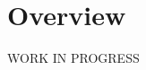 \documentclass[../../DD.tex]{subfiles}
\begin{document}
\section{Overview}
	WORK IN PROGRESS
	
\end{document}
